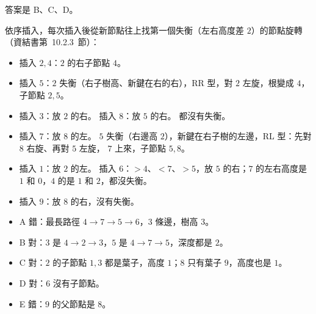 \begin{pastsoln}
答案是 B、C、D。

依序插入，每次插入後從新節點往上找第一個失衡（左右高度差 $2$）的節點旋轉（資結書第~10.2.3~節）：
\begin{itemize}
\item 插入 $2, 4$：$2$ 的右子節點 $4$。
\item 插入 $5$：$2$ 失衡（右子樹高、新鍵在右的右），RR 型，對 $2$ 左旋，根變成 $4$，子節點 $2, 5$。
\item 插入 $3$：放 $2$ 的右。 插入 $8$：放 $5$ 的右。 都沒有失衡。
\item 插入 $7$：放 $8$ 的左。 $5$ 失衡（右邊高 $2$），新鍵在右子樹的左邊，RL 型：先對 $8$ 右旋、再對 $5$ 左旋，
$7$ 上來，子節點 $5, 8$。
\item 插入 $1$：放 $2$ 的左。 插入 $6$：$>4$、$<7$、$>5$，放 $5$ 的右；$7$ 的左右高度是 $1$ 和 $0$，$4$ 的是 $1$ 和
$2$，都沒失衡。
\item 插入 $9$：放 $8$ 的右，沒有失衡。
\end{itemize}
\begin{center}
\end{center}
\begin{itemize}
\item A 錯：最長路徑 $4 \to 7 \to 5 \to 6$，$3$ 條邊，樹高 $3$。
\item B 對：$3$ 是 $4 \to 2 \to 3$，$5$ 是 $4 \to 7 \to 5$，深度都是 $2$。
\item C 對：$2$ 的子節點 $1, 3$ 都是葉子，高度 $1$；$8$ 只有葉子 $9$，高度也是 $1$。
\item D 對：$6$ 沒有子節點。
\item E 錯：$9$ 的父節點是 $8$。
\end{itemize}
\end{pastsoln}
